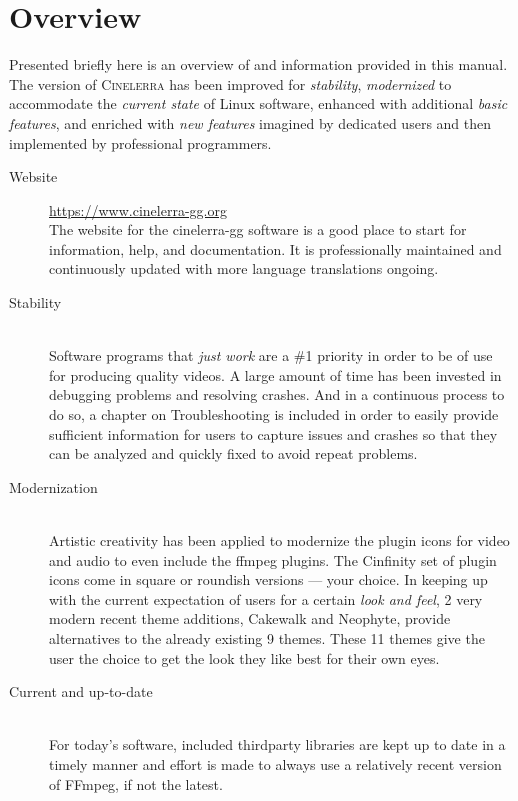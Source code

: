 \section*{\CGG{} Overview}%
\label{sec:cinelerra_overview}

Presented briefly here is an overview of \CGGI{} and information
provided in this manual. The \GG{} version of \textsc{Cinelerra} has
been improved for \emph{stability}, \emph{modernized} to accommodate
the \emph{current state} of Linux software, enhanced with additional
\emph{basic features}, and enriched with \emph{new features}
imagined by dedicated users and then implemented by professional
programmers.

\begin{description}
    \item[Website] \href{https://www.cinelerra-gg.org}{https://www.cinelerra-gg.org}\\
        The website for the cinelerra-gg software is a good place to start for information, help, and documentation.
        It is professionally maintained and continuously updated with more language
        translations ongoing.
    \item[Stability]~\\
        Software programs that \textit{just work} are a \#1 priority in order to be of use for producing quality videos.
        A large amount of time has been invested in debugging problems and resolving crashes.
        And in a continuous process to do so, a chapter on Troubleshooting is included in order to easily provide sufficient information for users to capture issues and crashes so that they can be analyzed and quickly fixed to avoid repeat problems.
    \item[Modernization]~\\
        Artistic creativity has been applied to modernize the \CGG{} plugin icons for video and audio to even include the ffmpeg plugins.
        The Cinfinity set of plugin icons come in square or roundish versions --- your choice.
        In keeping up with the current expectation of users for a certain \textit{look and feel}, 2 very modern recent theme additions, Cakewalk and Neophyte, provide alternatives to the already existing 9 themes.
        These 11 themes give the user the choice to get the look they like best for their own eyes.
    \item[Current and up-to-date]~\\
        For today’s software, included thirdparty libraries are kept up to date in a timely manner and effort is made to always use a relatively recent version of FFmpeg, if not the latest.

\end{description}
